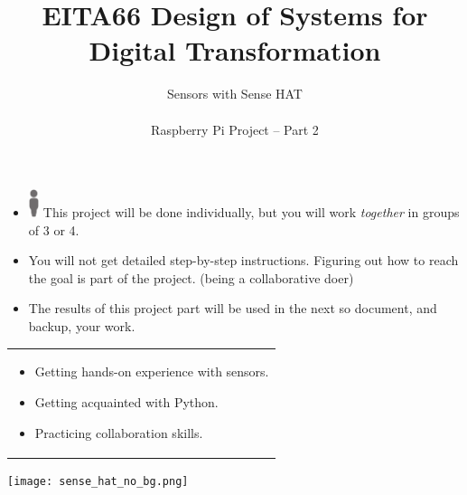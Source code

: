 \documentclass{article}
\title{EITA66 Design of Systems for Digital Transformation\\\year}
\author{{\huge Sensors with Sense HAT}\\\\Raspberry Pi Project -- Part 2}
\begin{document}
\clearpage\maketitle
\thispagestyle{empty}%

\begin{itemize}
\item \includegraphics[width=3mm]{person.png} This project will be done individually, but you will work \textit{together} in groups of 3 or 4.
\item You will not get detailed step-by-step instructions. Figuring out how to reach the goal is part of the project. (being a collaborative doer)
\item The results of this project part will be used in the next so document, and backup, your work.
\end{itemize}

\vspace{.1cm}
\begin{center}
\begin{tabular}{l}
\toprule[1.5pt]
\parbox{0.8\linewidth}{
\vspace{.2cm}{\Large Learning goals:}
\begin{itemize}
\item Getting hands-on experience with sensors.
\item Getting acquainted with Python.
\item Practicing collaboration skills.
\end{itemize}}\\
\bottomrule[1.5pt]
\end{tabular}
\end{center}

\vfill
\begin{center}
\texttt{[image: sense\_hat\_no\_bg.png]}
\end{center}
\vspace{2cm}
\end{document}
